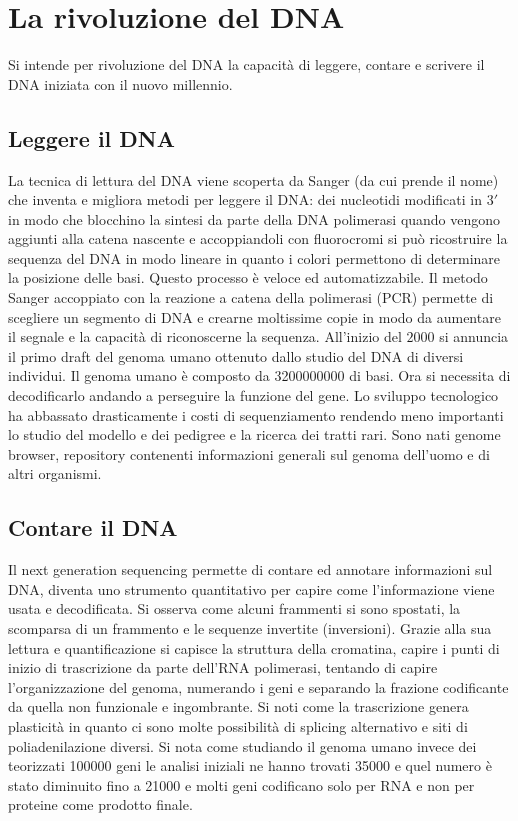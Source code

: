 \section{La rivoluzione del DNA}
Si intende per rivoluzione del DNA la capacit\`a di leggere, contare e scrivere il DNA iniziata con il nuovo millennio. 
\subsection{Leggere il DNA}
La tecnica di lettura del DNA viene scoperta da Sanger (da cui prende il nome) che inventa e migliora metodi per leggere il DNA: dei nucleotidi modificati in $3'$ in modo che blocchino
la sintesi da parte della DNA polimerasi quando vengono aggiunti alla catena nascente e accoppiandoli con fluorocromi si pu\`o ricostruire la sequenza del DNA in modo lineare in quanto
i colori permettono di determinare la posizione delle basi. Questo processo \`e veloce ed automatizzabile. Il metodo Sanger accoppiato con la reazione a catena della polimerasi (PCR)
permette di scegliere un segmento di DNA e crearne moltissime copie  in modo da aumentare il segnale e la capacit\`a di riconoscerne la sequenza. All'inizio del $2000$ si annuncia il 
primo draft del genoma umano ottenuto dallo studio del DNA di diversi individui. Il genoma umano \`e composto da \num{3200000000} di basi. Ora si necessita di decodificarlo 
andando a perseguire la funzione del gene. Lo sviluppo tecnologico ha abbassato drasticamente i costi di sequenziamento rendendo meno importanti lo studio del modello e dei pedigree e 
la ricerca dei tratti rari. Sono nati genome browser, repository contenenti informazioni generali sul genoma dell'uomo e di altri organismi. 
\subsection{Contare il DNA}
Il next generation sequencing permette di contare ed annotare informazioni sul DNA, diventa uno strumento quantitativo per capire come l'informazione viene usata e decodificata. Si 
osserva come alcuni frammenti si sono spostati, la scomparsa di un frammento e le sequenze invertite (inversioni). Grazie alla sua lettura e quantificazione si capisce la struttura della
cromatina, capire i punti di inizio di trascrizione da parte dell'RNA polimerasi, tentando di capire l'organizzazione del genoma, numerando i geni e separando la frazione codificante
da quella non funzionale e ingombrante. Si noti come la trascrizione genera plasticit\`a in quanto ci sono molte possibilit\`a di splicing alternativo e siti di poliadenilazione 
diversi. Si nota come studiando il genoma umano invece dei teorizzati \num{100000} geni le analisi iniziali ne hanno trovati \num{35000} e quel numero \`e stato diminuito fino 
a \num{21000} e molti geni codificano solo per RNA e non per proteine come prodotto finale. 
